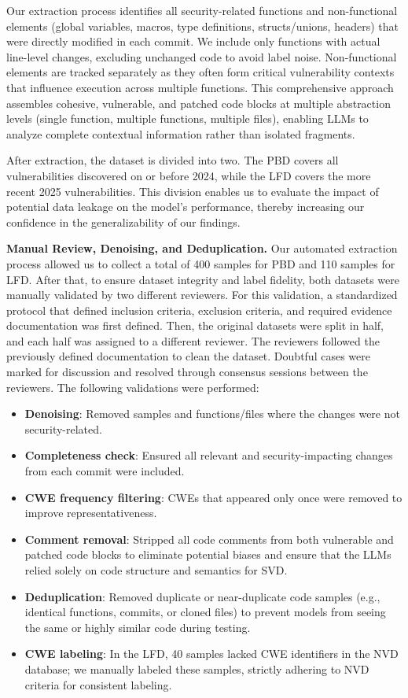 \documentclass[lettersize,journal]{IEEEtran}
\begin{document}
Our extraction process identifies all security-related functions and non-functional elements (global variables, macros, type definitions, structs/unions, headers) that were directly modified in each commit. We include only functions with actual line-level changes, excluding unchanged code to avoid label noise. Non-functional elements are tracked separately as they often form critical vulnerability contexts that influence execution across multiple functions. This comprehensive approach assembles cohesive, vulnerable, and patched code blocks at multiple abstraction levels (single function, multiple functions, multiple files), enabling \glspl{LLM} to analyze complete contextual information rather than isolated fragments.

After extraction, the dataset is divided into two. The \gls{PBD} covers all vulnerabilities discovered on or before 2024, while the \gls{LFD} covers the more recent 2025 vulnerabilities. This division enables us to evaluate the impact of potential data leakage on the model's performance, thereby increasing our confidence in the generalizability of our findings.

\textbf{Manual Review, Denoising, and Deduplication.} Our automated extraction process allowed us to collect a total of 400 samples for PBD and 110 samples for LFD. After that, to ensure dataset integrity and label fidelity, both datasets were manually validated by two different reviewers. For this validation, a standardized protocol that defined inclusion criteria, exclusion criteria, and required evidence documentation was first defined. Then, the original datasets were split in half, and each half was assigned to a different reviewer. The reviewers followed the previously defined documentation to clean the dataset. Doubtful cases were marked for discussion and resolved through consensus sessions between the reviewers. The following validations were performed:

\begin{itemize}
    \item \textbf{Denoising}: Removed samples and functions/files where the changes were not security-related.
    \item \textbf{Completeness check}: Ensured all relevant and security-impacting changes from each commit were included.
    \item \textbf{\gls{CWE} frequency filtering}: CWEs that appeared only once were removed to improve representativeness.
    \item \textbf{Comment removal}: Stripped all code comments from both vulnerable and patched code blocks to eliminate potential biases and ensure that the \glspl{LLM} relied solely on code structure and semantics for \gls{SVD}.
    \item \textbf{Deduplication}: Removed duplicate or near-duplicate code samples (e.g., identical functions, commits, or cloned files) to prevent models from seeing the same or highly similar code during testing.
    \item \textbf{\gls{CWE} labeling}: In the LFD, 40 samples lacked \gls{CWE} identifiers in the NVD database; we manually labeled these samples, strictly adhering to NVD criteria for consistent labeling.
\end{itemize}
\end{document}
